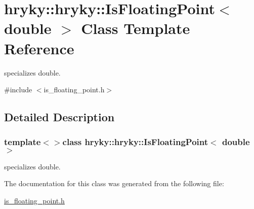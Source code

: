 \hypertarget{classhryky_1_1hryky_1_1_is_floating_point_3_01double_01_4}{\section{hryky\-:\-:hryky\-:\-:Is\-Floating\-Point$<$ double $>$ Class Template Reference}
\label{classhryky_1_1hryky_1_1_is_floating_point_3_01double_01_4}
}


specializes double.  




{\ttfamily \#include $<$is\-\_\-floating\-\_\-point.\-h$>$}



\subsection{Detailed Description}
\subsubsection*{template$<$$>$class hryky\-::hryky\-::\-Is\-Floating\-Point$<$ double $>$}

specializes double. 

The documentation for this class was generated from the following file\-:\begin{DoxyCompactItemize}
\item 
\hyperlink{is__floating__point_8h}{is\-\_\-floating\-\_\-point.\-h}\end{DoxyCompactItemize}
